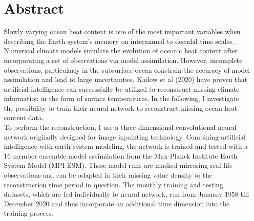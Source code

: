 \documentclass[Masterarbeit.tex]{subfile}
\begin{document}
	
	\chapter*{Abstract}
	
	Slowly varying ocean heat content is one of the most important variables when describing the Earth system's memory on interannual to decadal time scales. Numerical climate models simulate the evolution of oceanic heat content after incorporating a set of observations via model assimilation. However, incomplete observations, particularly in the subsurface ocean constrain the accuracy of model assimilation and lead to large uncertainties. Kadow et al (2020) have proven that artificial intelligence can successfully be utilized to reconstruct missing climate information in the form of surface temperatures. In the following, I investigate the possibility to train their neural network to reconstruct missing ocean heat content data. \\
	To perform the reconstruction, I use a three-dimensional convolutional neural network originally designed for image inpainting technology. Combining artificial intelligence with earth system modeling, the network is trained and tested with a 16 member ensemble model assimilation from the Max-Planck Institute Earth System Model (MPI-ESM). These model runs are masked mirroring real life observations and can be adapted in their missing value density to the reconstruction time period in question. The monthly training and testing datasets, which are fed individually to neural network, run from January 1958 till December 2020 and thus incorporate an additional time dimension into the training process. \\
	
	
\end{document}
